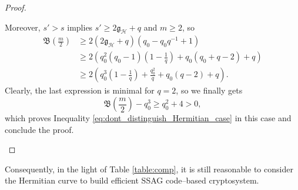\documentclass[peerreview]{IEEEtran}
\theoremstyle{plain}
\theoremstyle{definition}
\theoremstyle{remark}
\newcommand{\calH}{\mathcal{H}}
\begin{document}
\begin{proof}
\begin{itemize}
			 Moreover, $s'>s$ implies $s' \geq 2\mathfrak{g}_{\calH}+q$ and $m \geq 2$, so
			\begin{align*}
				\mathfrak{B}\left(\frac{m}{2}\right)
				&\geq 2(2\mathfrak{g}_{\calH}+q)(q_0-q_0q^{-1}+1)\\ 
				&\geq 2\left(q_0^2(q_0-1)\left(1-\frac{1}{q}\right)+q_0(q_0+q-2)+q\right) \\
				& \geq 2\left( q_0^3\left(1 - \frac{1}{q}\right)+ \frac{q_0^2}{q}+ q_0(q-2)+q\right).
			\end{align*}
			Clearly, the last expression is minimal for $q=2$, so we finally gets
			$$\mathfrak{B}\left(\frac{m}{2}\right)-q_0^3 \geq q_0^2 + 4 >0,$$
			which proves Inequality \eqref{eq:dont_distinguish_Hermitian_case} in this case and conclude the proof.
		\end{itemize}
	\end{proof}
	Consequently, in the light of Table \ref{table:comp}, it is still reasonable to consider the Hermitian curve to build efficient SSAG code--based cryptosystem.
	

	
	

	
	\newpage
	


\end{document}
